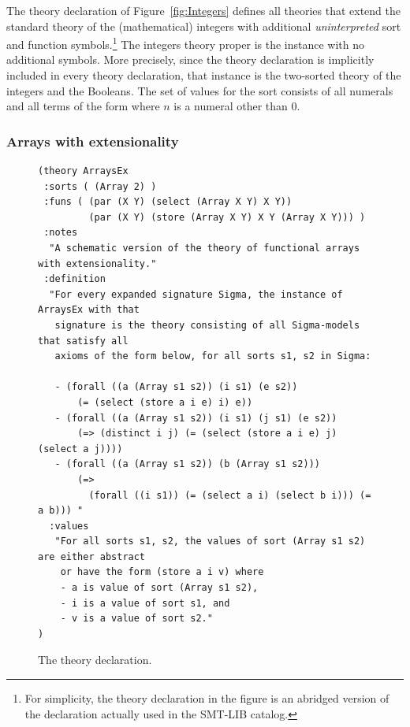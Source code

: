 The theory declaration of Figure~\ref{fig:Integers} defines all theories
that extend the standard theory of the (mathematical) integers with additional 
\emph{uninterpreted} sort and function symbols.\footnote{%
For simplicity, the theory declaration in the figure is an abridged version of 
the declaration actually used in the SMT-LIB catalog.
}
The integers theory proper is the instance with no additional symbols.
More precisely,
since the  theory declaration is implicitly included in
every theory declaration,
that instance is the two-sorted theory of the integers and the Booleans.
The set of values for the  sort consists of all numerals and 
all terms of the form 
where $n$ is a numeral other than $0$.


\subsubsection*{Arrays with extensionality}

\begin{figure}[h]
\small
{\color{NavyBlue}
\begin{verbatim}
(theory ArraysEx
 :sorts ( (Array 2) )
 :funs ( (par (X Y) (select (Array X Y) X Y))
         (par (X Y) (store (Array X Y) X Y (Array X Y))) )
 :notes
  "A schematic version of the theory of functional arrays with extensionality."
 :definition
  "For every expanded signature Sigma, the instance of ArraysEx with that
   signature is the theory consisting of all Sigma-models that satisfy all 
   axioms of the form below, for all sorts s1, s2 in Sigma:
  
   - (forall ((a (Array s1 s2)) (i s1) (e s2))
       (= (select (store a i e) i) e))
   - (forall ((a (Array s1 s2)) (i s1) (j s1) (e s2))
       (=> (distinct i j) (= (select (store a i e) j) (select a j))))
   - (forall ((a (Array s1 s2)) (b (Array s1 s2)))
       (=> 
         (forall ((i s1)) (= (select a i) (select b i))) (= a b))) "
  :values
   "For all sorts s1, s2, the values of sort (Array s1 s2) are either abstract 
    or have the form (store a i v) where
    - a is value of sort (Array s1 s2),
    - i is a value of sort s1, and 
    - v is a value of sort s2."
)
\end{verbatim}
}%
%
%
\caption{The  theory declaration.}
\label{fig:ArraysEx}
\end{figure}

